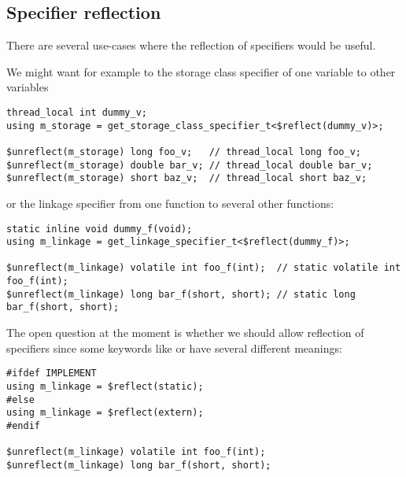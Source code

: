\subsection{Specifier reflection}
\label{fut-specifiers}

There are several use-cases where the reflection of specifiers would
be useful.

We might want for example to  the storage class specifier of
one variable to other variables

\begin{verbatim}
thread_local int dummy_v;
using m_storage = get_storage_class_specifier_t<$reflect(dummy_v)>;

$unreflect(m_storage) long foo_v;   // thread_local long foo_v;
$unreflect(m_storage) double bar_v; // thread_local double bar_v;
$unreflect(m_storage) short baz_v;  // thread_local short baz_v;
\end{verbatim}

or the linkage specifier from one function
to several other functions:

\begin{verbatim}
static inline void dummy_f(void);
using m_linkage = get_linkage_specifier_t<$reflect(dummy_f)>;

$unreflect(m_linkage) volatile int foo_f(int);  // static volatile int foo_f(int);
$unreflect(m_linkage) long bar_f(short, short); // static long bar_f(short, short);
\end{verbatim}

The open question at the moment is whether we should allow 
reflection of specifiers since some keywords like \verb@inline@ or \verb@virtual@
have several different meanings:

\begin{verbatim}
#ifdef IMPLEMENT
using m_linkage = $reflect(static);
#else
using m_linkage = $reflect(extern);
#endif

$unreflect(m_linkage) volatile int foo_f(int);
$unreflect(m_linkage) long bar_f(short, short);
\end{verbatim}

